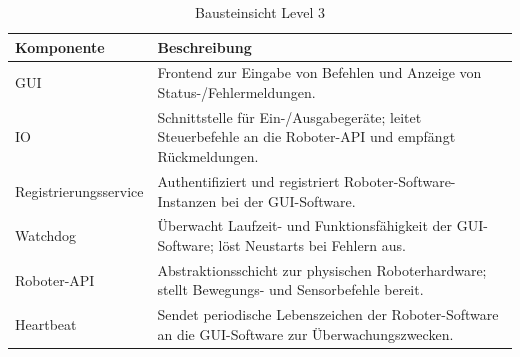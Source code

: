 \begin{table}[h!]
\centering
\begin{tabular}{|p{4cm}|p{9cm}|}
\hline
\textbf{Komponente} & \textbf{Beschreibung} \\ \hline
GUI & Frontend zur Eingabe von Befehlen und Anzeige von Status-/Fehler­meldungen. \\ \hline
IO  & Schnittstelle für Ein-/Ausgabe­geräte; leitet Steuerbefehle an die Roboter-API und empfängt Rückmeldungen. \\ \hline
Registrierungsservice & Authentifiziert und registriert Roboter-Software-Instanzen bei der GUI-Software. \\ \hline
Watchdog & Überwacht Laufzeit- und Funktions­fähigkeit der GUI-Software; löst Neustarts bei Fehlern aus. \\ \hline
Roboter-API & Abstraktionsschicht zur physischen Roboter­hardware; stellt Bewegungs- und Sensor­befehle bereit. \\ \hline
Heartbeat & Sendet periodische Lebenszeichen der Roboter-Software an die GUI-Software zur Überwachungs­zwecken. \\ \hline
\end{tabular}
\caption{Bausteinsicht Level 3}
\label{tab:lvl3}
\end{table}


